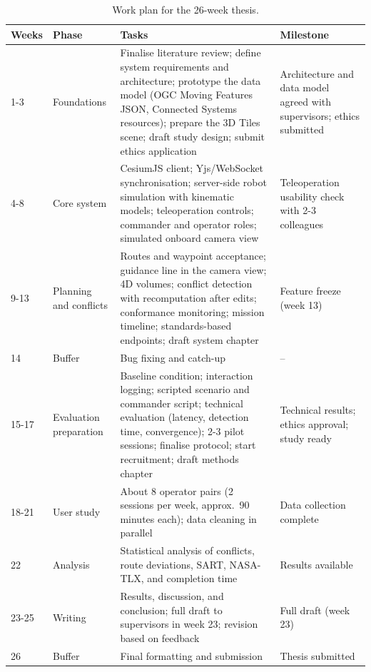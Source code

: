 \documentclass{article}
\begin{document}
\begin{table}[h]
\centering
\small
\renewcommand{\arraystretch}{1.3}
\begin{tabularx}{\textwidth}{@{}l>{\raggedright\arraybackslash}p{2.3cm}>{\raggedright\arraybackslash}X>{\raggedright\arraybackslash}p{3.2cm}@{}}
\toprule
\textbf{Weeks} & \textbf{Phase} & \textbf{Tasks} & \textbf{Milestone} \\
\midrule
1-3 & Foundations & Finalise literature review; define system requirements and architecture; prototype the data model (OGC Moving Features JSON, Connected Systems resources); prepare the 3D Tiles scene; draft study design; submit ethics application & Architecture and data model agreed with supervisors; ethics submitted \\
4-8 & Core system & CesiumJS client; Yjs/WebSocket synchronisation; server-side robot simulation with kinematic models; teleoperation controls; commander and operator roles; simulated onboard camera view & Teleoperation usability check with 2-3 colleagues \\
9-13 & Planning and conflicts & Routes and waypoint acceptance; guidance line in the camera view; 4D volumes; conflict detection with recomputation after edits; conformance monitoring; mission timeline; standards-based endpoints; draft system chapter & Feature freeze (week 13) \\
14 & Buffer & Bug fixing and catch-up & -- \\
15-17 & Evaluation preparation & Baseline condition; interaction logging; scripted scenario and commander script; technical evaluation (latency, detection time, convergence); 2-3 pilot sessions; finalise protocol; start recruitment; draft methods chapter & Technical results; ethics approval; study ready \\
18-21 & User study & About 8 operator pairs (2 sessions per week, approx.\ 90 minutes each); data cleaning in parallel & Data collection complete \\
22 & Analysis & Statistical analysis of conflicts, route deviations, SART, NASA-TLX, and completion time & Results available \\
23-25 & Writing & Results, discussion, and conclusion; full draft to supervisors in week 23; revision based on feedback & Full draft (week 23) \\
26 & Buffer & Final formatting and submission & Thesis submitted \\
\bottomrule
\end{tabularx}
\caption{Work plan for the 26-week thesis.}
\label{tab:workplan}
\end{table}
\end{document}
